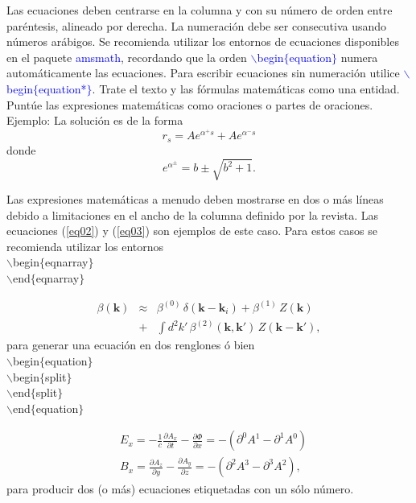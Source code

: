 \documentclass{analesafa}
\begin{document}
Las ecuaciones deben centrarse en la columna y con su número de orden entre paréntesis, alineado por derecha. La numeración debe ser consecutiva usando números arábigos. Se recomienda utilizar los entornos de ecuaciones disponibles en el paquete \textcolor{Blue}{\textsf{amsmath}},  recordando que
la orden \textcolor{Blue}{\textsf{$\backslash$begin$\{$equation$\}$}} numera automáticamente las ecuaciones. Para escribir ecuaciones sin numeración utilice  \textcolor{Blue}{\textsf{$\backslash$begin$\{$equation*$\}$}}.
Trate el texto y las fórmulas matemáticas como una entidad. Puntúe las expresiones matemáticas como oraciones o partes de oraciones. 
Ejemplo: La solución es de la forma
\begin{equation}
r_{s} = A e^{\alpha^{+}s} + A e^{\alpha^{-}s}
\label{eq01}
\end{equation}
donde 
\begin{equation*}
e^{\alpha^{\pm}} = b \pm \sqrt{b^{2}+1}.
\label{eq01a}
\end{equation*}


Las expresiones matemáticas a menudo deben mostrarse en dos o más líneas debido a limitaciones en el ancho de la columna definido por la revista. Las ecuaciones (\ref{eq02}) y (\ref{eq03}) son ejemplos de este caso. Para estos casos se recomienda utilizar los entornos  \\
\color{Blue}
\textsf{$\backslash$begin$\{$eqnarray$\}$} \\ \textsf{$\backslash$end$\{$eqnarray$\}$} \\
\color{black} 

\begin{eqnarray}
\beta(\mathbf{k}) & \approx & \beta^{(0)}\,\delta(\mathbf{k}-\mathbf{k}_i) + \beta^{(1)}\,Z(\mathbf{k}) \nonumber\\
 & + & \int d^2k'\,\beta^{(2)}(\mathbf{k},\mathbf{k}')\,Z(\mathbf{k}-\mathbf{k}'),
\label{eq02}
\end{eqnarray}
para generar una ecuación en dos renglones ó  bien \\
\color{Blue}
\textsf{$\backslash$begin$\{$equation$\}$} \\ 
\textsf{$\backslash$begin$\{$split$\}$}  \\
\textsf{$\backslash$end$\{$split$\}$}  \\
\textsf{$\backslash$end$\{$equation$\}$}
\color{black}


\begin{equation}
\begin{split}
& E_{x}=-\frac{1}{c}\frac{\partial A_{x}}{\partial t}-\frac{\partial \Phi}{\partial x} = - (\partial^{0}A^{1}-\partial^{1}A^{0}) \\
& B_{x}=\frac{\partial A_{z}}{\partial y}-\frac{\partial A_{y}}{\partial z}=-(\partial^{2}A^{3}-\partial^{3}A^{2}),
\end{split}
\label{eq03}
\end{equation}
para producir dos (o más) ecuaciones etiquetadas con un sólo número.
\end{document}

